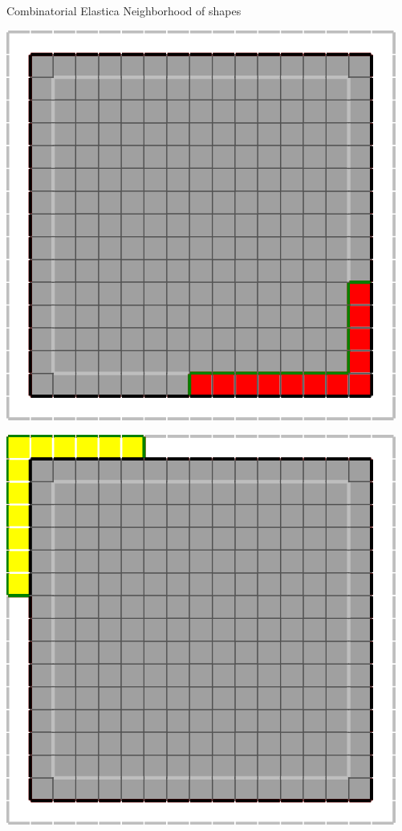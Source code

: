 \begin{frame}
	{Combinatorial Elastica}	
	{Neighborhood of shapes}
	
\begin{minipage}{0.49\textwidth}
\center
\includegraphics[scale=0.25]{figures/combinatorial-elastica/main-inner.png}	
\end{minipage}
\begin{minipage}{0.49\textwidth}
\includegraphics[scale=0.25]{figures/combinatorial-elastica/main-outer.png}	
\end{minipage}	
\end{frame}

